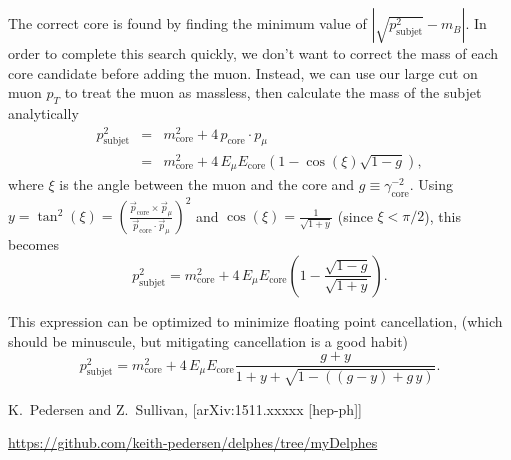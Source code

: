 \documentclass[10pt]{article}
\newcommand{\pT}{p_{T}^{}}
\newcommand{\pSubjet}[1][] {p_{\mathrm{subjet}}^{#1}}
\newcommand{\pCore}[1][]   {p_{\mathrm{core}}^{#1}}
\newcommand{\pCoreV}       {\vec{p}_{\mathrm{core}}^{}}
\newcommand{\pMu}[1][]     {p_{\mu}^{#1}}
\newcommand{\pMuV}       {\vec{p}_{\mu}^{}}
\newcommand{\mCore}[1][]     {m_{\mathrm{core}}^{#1}}
\newcommand{\ECore}[1][]     {E_{\mathrm{core}}^{#1}}
\newcommand{\gammaCore}[1][] {\gamma_{\mathrm{core}}^{#1}}
\newcommand{\EMu}[1][]       {E_{\mu}^{#1}}
\begin{document}
The correct core is found by finding the minimum value of 
$\left|\sqrt{\pSubjet[2]}-m_B^{}\right|$. In order to complete this search 
quickly, we don't want to correct the mass of each core candidate before
adding the muon. Instead, we can use our large cut on muon $\pT$ to treat
the muon as massless, then calculate the mass of the subjet analytically
%
\begin{eqnarray}
\pSubjet[2] & = & \mCore[2]+4\,\pCore\cdot\pMu \nonumber \\
& = & \mCore[2]+4\,\EMu\ECore(1-\cos(\xi)\sqrt{1-g}),
\end{eqnarray}
%
where $\xi$ is the angle between the muon and the core and $g\equiv\gammaCore[-2]$.
Using $y=\tan^{2}(\xi)=\left(\frac{\pCoreV\times\pMuV}{\pCoreV\cdot\pMuV}\right)^2$
and $\cos(\xi)=\frac{1}{\sqrt{1+y}}$ (since $\xi<\pi/2$), this becomes
%
\begin{equation}
\pSubjet[2]=\mCore[2]+4\,\EMu\ECore(1-\frac{\sqrt{1-g}}{\sqrt{1+y}}).
\end{equation}
%

This expression can be optimized to minimize floating point cancellation,
(which should be minuscule, but mitigating cancellation is a good habit)
%
\begin{equation}
\pSubjet[2]=\mCore[2]+4\,\EMu\ECore\frac{g+y}{1+y+\sqrt{1-((g-y)+g\,y)}}.
\end{equation}

\begin{thebibliography}{}

  K.~Pedersen and Z.~Sullivan,
  [arXiv:1511.xxxxx [hep-ph]]

  \url{https://github.com/keith-pedersen/delphes/tree/myDelphes}

\end{thebibliography}
\end{document}
